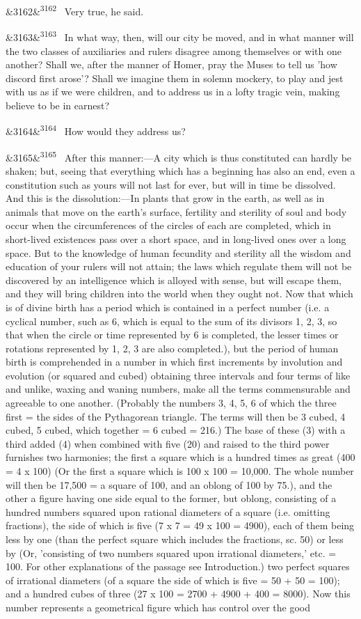 \documentclass[12pt]{article}
\newcommand{\para}[1][]{\par\noindent\ifx&#1&\else\textsuperscript{\footnotesize #1}~\fi}
\begin{document}
\para[3162] Very true, he said.

\para[3163] In what way, then, will our city be moved, and in what manner will the two classes of auxiliaries and rulers disagree among themselves or with one another? Shall we, after the manner of Homer, pray the Muses to tell us 'how discord first arose'? Shall we imagine them in solemn mockery, to play and jest with us as if we were children, and to address us in a lofty tragic vein, making believe to be in earnest?

\para[3164] How would they address us?

\para[3165] After this manner:---A city which is thus constituted can hardly be shaken; but, seeing that everything which has a beginning has also an end, even a constitution such as yours will not last for ever, but will in time be dissolved. And this is the dissolution:---In plants that grow in the earth, as well as in animals that move on the earth's surface, fertility and sterility of soul and body occur when the circumferences of the circles of each are completed, which in short-lived existences pass over a short space, and in long-lived ones over a long space. But to the knowledge of human fecundity and sterility all the wisdom and education of your rulers will not attain; the laws which regulate them will not be discovered by an intelligence which is alloyed with sense, but will escape them, and they will bring children into the world when they ought not. Now that which is of divine birth has a period which is contained in a perfect number (i.e. a cyclical number, such as 6, which is equal to the sum of its divisors 1, 2, 3, so that when the circle or time represented by 6 is completed, the lesser times or rotations represented by 1, 2, 3 are also completed.), but the period of human birth is comprehended in a number in which first increments by involution and evolution (or squared and cubed) obtaining three intervals and four terms of like and unlike, waxing and waning numbers, make all the terms commensurable and agreeable to one another. (Probably the numbers 3, 4, 5, 6 of which the three first = the sides of the Pythagorean triangle. The terms will then be 3 cubed, 4 cubed, 5 cubed, which together = 6 cubed = 216.) The base of these (3) with a third added (4) when combined with five (20) and raised to the third power furnishes two harmonies; the first a square which is a hundred times as great (400 = 4 x 100) (Or the first a square which is 100 x 100 = 10,000. The whole number will then be 17,500 = a square of 100, and an oblong of 100 by 75.), and the other a figure having one side equal to the former, but oblong, consisting of a hundred numbers squared upon rational diameters of a square (i.e. omitting fractions), the side of which is five (7 x 7 = 49 x 100 = 4900), each of them being less by one (than the perfect square which includes the fractions, sc. 50) or less by (Or, 'consisting of two numbers squared upon irrational diameters,' etc. = 100. For other explanations of the passage see Introduction.) two perfect squares of irrational diameters (of a square the side of which is five = 50 + 50 = 100); and a hundred cubes of three (27 x 100 = 2700 + 4900 + 400 = 8000). Now this number represents a geometrical figure which has control over the good 
\end{document}
